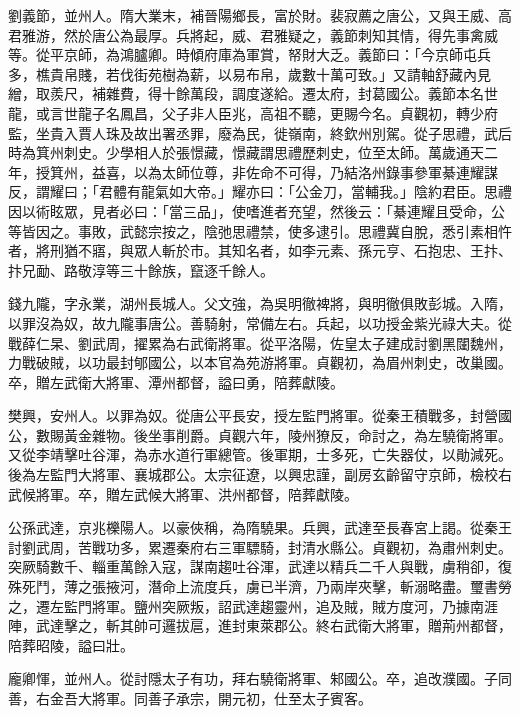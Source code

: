 \begin{pinyinscope}
 劉義節，並州人。隋大業末，補晉陽鄉長，富於財。裴寂薦之唐公，又與王威、高君雅游，然於唐公為最厚。兵將起，威、君雅疑之，義節刺知其情，得先事禽威等。從平京師，為鴻臚卿。時傾府庫為軍賞，帑財大乏。義節曰：「今京師屯兵多，樵貴帛賤，若伐街苑樹為薪，以易布帛，歲數十萬可致。」又請軸舒藏內見繒，取羨尺，補雜費，得十餘萬段，調度遂給。遷太府，封葛國公。義節本名世龍，或言世龍子名鳳昌，父子非人臣兆，高祖不聽，更賜今名。貞觀初，轉少府監，坐貴入賈人珠及故出署丞罪，廢為民，徙嶺南，終欽州別駕。從子思禮，武后時為箕州刺史。少學相人於張憬藏，憬藏謂思禮歷刺史，位至太師。萬歲通天二年，授箕州，益喜，以為太師位尊，非佐命不可得，乃結洛州錄事參軍綦連耀謀反，謂耀曰；「君體有龍氣如大帝。」耀亦曰：「公金刀，當輔我。」陰約君臣。思禮因以術眩眾，見者必曰：「當三品」，使嗜進者充望，然後云：「綦連耀且受命，公等皆因之。事敗，武懿宗按之，陰弛思禮禁，使多逮引。思禮冀自脫，悉引素相忤者，將刑猶不寤，與眾人斬於市。其知名者，如李元素、孫元亨、石抱忠、王抃、抃兄勔、路敬淳等三十餘族，竄逐千餘人。



 錢九隴，字永業，湖州長城人。父文強，為吳明徹裨將，與明徹俱敗彭城。入隋，以罪沒為奴，故九隴事唐公。善騎射，常備左右。兵起，以功授金紫光祿大夫。從戰薛仁杲、劉武周，擢累為右武衛將軍。從平洛陽，佐皇太子建成討劉黑闥魏州，力戰破賊，以功最封郇國公，以本官為苑游將軍。貞觀初，為眉州刺史，改巢國。卒，贈左武衛大將軍、潭州都督，謚曰勇，陪葬獻陵。



 樊興，安州人。以罪為奴。從唐公平長安，授左監門將軍。從秦王積戰多，封營國公，數賜黃金雜物。後坐事削爵。貞觀六年，陵州獠反，命討之，為左驍衛將軍。又從李靖擊吐谷渾，為赤水道行軍總管。後軍期，士多死，亡失器仗，以勛減死。後為左監門大將軍、襄城郡公。太宗征遼，以興忠謹，副房玄齡留守京師，檢校右武候將軍。卒，贈左武候大將軍、洪州都督，陪葬獻陵。



 公孫武達，京兆櫟陽人。以豪俠稱，為隋驍果。兵興，武達至長春宮上謁。從秦王討劉武周，苦戰功多，累遷秦府右三軍驃騎，封清水縣公。貞觀初，為肅州刺史。突厥騎數千、輜重萬餘入寇，謀南趨吐谷渾，武達以精兵二千人與戰，虜稍卻，復殊死鬥，薄之張掖河，潛命上流度兵，虜已半濟，乃兩岸夾擊，斬溺略盡。璽書勞之，遷左監門將軍。鹽州突厥叛，詔武達趨靈州，追及賊，賊方度河，乃據南涯陣，武達擊之，斬其帥可邏拔扈，進封東萊郡公。終右武衛大將軍，贈荊州都督，陪葬昭陵，謚曰壯。



 龐卿惲，並州人。從討隱太子有功，拜右驍衛將軍、邾國公。卒，追改濮國。子同善，右金吾大將軍。同善子承宗，開元初，仕至太子賓客。




\end{pinyinscope}
